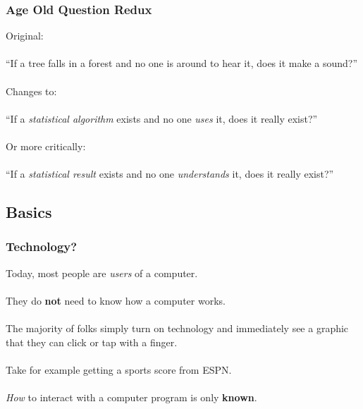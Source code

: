 \documentclass{beamer}\usepackage[]{graphicx}\usepackage[]{color}
\begin{document}
\begin{frame}
\frametitle{Age Old Question Redux}

Original: \\$ $\\
{\Large
``If a tree falls in a forest and no one is around to hear it, does it make a sound?''
}
\\$ $\\ Changes to: \\$ $\\
{\Large
``If a \emph{statistical algorithm} exists and no one \emph{uses} it, does it really exist?''
}
\\$ $\\ Or more critically: \\$ $\\
{\Large
``If a \emph{statistical result} exists and no one \emph{understands} it, does it really exist?''
}
\end{frame}

\subsection{Basics}

\begin{frame}
\frametitle{Technology?}

Today, most people are \emph{users} of a computer. 
\\$ $\\
They do \textbf{not} need to know how a computer works. 
\\$ $\\
The majority of folks simply turn on technology and immediately see a graphic that they can click or tap with a finger.
\\$ $\\
Take for example getting a sports score from ESPN.  
\\$ $\\
\emph{How} to interact with a computer program is only \textbf{known}.

\end{frame}
\end{document}

